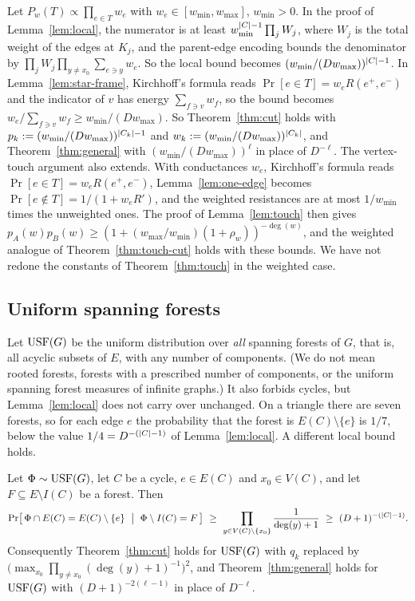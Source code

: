 \begin{remark}\label{rem:weighted}
Let $P_w(T)\propto\prod_{e\in T}w_e$ with $w_e\in[w_{\min},w_{\max}]$, $w_{\min}>0$. In the proof of Lemma~\ref{lem:local}, the numerator is at least $w_{\min}^{\lvert C\rvert-1}\prod_jW_j$, where $W_j$ is the total weight of the edges at $K_j$, and the parent-edge encoding bounds the denominator by $\prod_jW_j\prod_{y\ne x_0}\sum_{e\ni y}w_e$. So the local bound becomes $(w_{\min}/(Dw_{\max}))^{\lvert C\rvert-1}$. In Lemma~\ref{lem:star-frame}, Kirchhoff's formula reads $\Pr[e\in T]=w_eR(e^+,e^-)$ and the indicator of $v$ has energy $\sum_{f\ni v}w_f$, so the bound becomes $w_e/\sum_{f\ni v}w_f\ge w_{\min}/(Dw_{\max})$. So Theorem~\ref{thm:cut} holds with $p_k:=(w_{\min}/(Dw_{\max}))^{\lvert C_k\rvert-1}$ and $w_k:=(w_{\min}/(Dw_{\max}))^{\lvert C_k\rvert}$, and Theorem~\ref{thm:general} with $(w_{\min}/(Dw_{\max}))^{\ell}$ in place of $D^{-\ell}$. The vertex-touch argument also extends. With conductances $w_e$, Kirchhoff's formula reads $\Pr[e\in T]=w_eR(e^+,e^-)$, Lemma~\ref{lem:one-edge} becomes $\Pr[e\notin T]=1/(1+w_eR')$, and the weighted resistances are at most $1/w_{\min}$ times the unweighted ones. The proof of Lemma~\ref{lem:touch} then gives $p_A(w)p_B(w)\ge(1+(w_{\max}/w_{\min})(1+\rho_w))^{-\deg(w)}$, and the weighted analogue of Theorem~\ref{thm:touch-cut} holds with these bounds. We have not redone the constants of Theorem~\ref{thm:touch} in the weighted case.
\end{remark}

\subsection{Uniform spanning forests}

Let $\mathrm{USF}(G)$ be the uniform distribution over \emph{all} spanning forests of $G$, that is, all acyclic subsets of $E$, with any number of components. (We do not mean rooted forests, forests with a prescribed number of components, or the uniform spanning forest measures of infinite graphs.) It also forbids cycles, but Lemma~\ref{lem:local} does not carry over unchanged. On a triangle there are seven forests, so for each edge $e$ the probability that the forest is $E(C)\setminus\{e\}$ is $1/7$, below the value $1/4=D^{-(\lvert C\rvert-1)}$ of Lemma~\ref{lem:local}. A different local bound holds.

\begin{proposition}\label{prop:forest}
Let $\Phi\sim\mathrm{USF}(G)$, let $C$ be a cycle, $e\in E(C)$ and $x_0\in V(C)$, and let $F\subseteq E\setminus I(C)$ be a forest. Then
\[
  \Pr\bigl[\,\Phi\cap E(C)=E(C)\setminus\{e\}\ \bigm|\ \Phi\setminus I(C)=F\,\bigr]\ \ge\ \prod_{y\in V(C)\setminus\{x_0\}}\frac1{\deg(y)+1}\ \ge\ (D+1)^{-(\abs C-1)} .
\]
Consequently Theorem~\ref{thm:cut} holds for $\mathrm{USF}(G)$ with $q_k$ replaced by $\bigl(\max_{x_0}\prod_{y\ne x_0}(\deg(y)+1)^{-1}\bigr)^2$, and Theorem~\ref{thm:general} holds for $\mathrm{USF}(G)$ with $(D+1)^{-2(\ell-1)}$ in place of $D^{-\ell}$.
\end{proposition}

